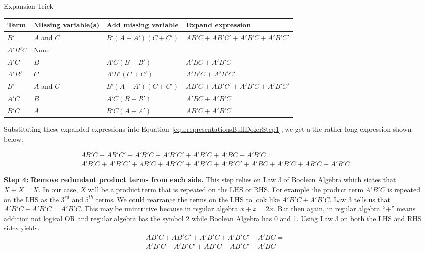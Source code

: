 \begin{process}{Expansion Trick}
\begin{tabular}[ht]{m{1cm}|m{2cm}|m{3cm}|m{3cm}}
Term        & Missing variable(s)    & Add missing variable    & Expand expression                        \\ \hline
$B'$        & $A$ and $C$        &    $B'(A + A')(C + C')$        &    $AB'C+AB'C' + A'B'C+A'B'C'$        \\ \hline
$A'B'C$    & None            &                        &                            \\ \hline
$A'C$        & $B$            &    $A'C(B+B')$                &    $A'BC+A'B'C$                \\ \hline

$A'B'$    & $C$            &    $A'B'(C+C')$             &    $A'B'C+A'B'C'$                \\ \hline
$B'$        & $A$ and $C$        &    $B'(A + A')(C + C')$        &    $AB'C+AB'C' + A'B'C+A'B'C'$        \\ \hline
$A'C$        & $B$            &    $A'C(B+B')$                &    $A'BC+A'B'C$                \\ \hline
$B'C$        & $A$            &    $B'C(A+A')$                &    $AB'C+A'B'C$    \\
\end{tabular}

Substituting these expanded expressions into Equation~\ref{equ:representationsBullDozerStep1}, we get a
the rather long expression shown below.

\begin{multline}
\label{equ:representationsBullDozerStep3}
AB'C + AB'C' + A'B'C + A'B'C' + A'B'C + A'BC + A'B'C = \\
A'B'C + A'B'C' + AB'C + AB'C' + A'B'C + A'B'C' + A'BC + A'B'C + AB'C + A'B'C
\end{multline}

\textbf{Step 4: Remove redundant product terms from each side.}
This step relies on Law 3 of Boolean Algebra which states that $X+X = X$.  In our case, $X$ will be
a product term that is repeated on the LHS or RHS.  For example the product term $A'B'C$ is repeated on the
LHS as the $3^{rd}$ and $5^{th}$ terms.  We could rearrange the terms on the LHS to look like
$A'B'C + A'B'C$.  Law 3 tells us that $A'B'C + A'B'C = A'B'C$. This may be unintuitive because in
regular algebra $x+x = 2x$.  But then again, in regular algebra ``+'' means addition not logical OR
and regular algebra has the symbol 2 while Boolean Algebra has 0 and 1.  Using Law 3 on both the LHS and RHS sides
yields:
\begin{multline}
\label{equ:representationsBullDozerStep4}
AB'C + AB'C' + A'B'C + A'B'C' + A'BC = \\
A'B'C + A'B'C' + AB'C + AB'C' + A'BC
\end{multline}


\end{process}
